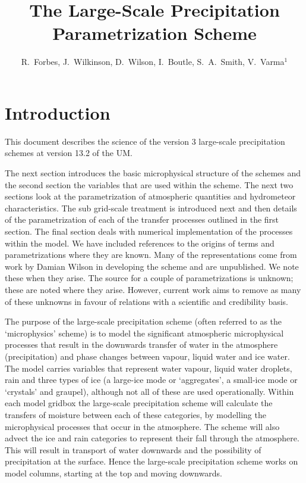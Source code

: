 \documentclass{UMDP_article}
\title{The Large-Scale Precipitation Parametrization Scheme}
\author{R.~Forbes, J.~Wilkinson, D.~Wilson, I.~Boutle, S.~A.~Smith, V.~Varma$^{1}$}
\begin{document}
\maketitle

\tableofcontents

\newpage
\section{Introduction}

This document describes the science of the version 3 large-scale precipitation 
schemes at version 13.2 of the UM.

The next section introduces the basic microphysical structure of the schemes 
and the second section the variables that are used within the scheme. 
The next two sections look at the parametrization of atmospheric quantities 
and hydrometeor characteristics. The sub grid-scale treatment is introduced next 
and then details of the parametrization of each of the transfer processes 
outlined in the first section. The final section deals with numerical 
implementation of the processes within the model. 
We have included references to the origins of terms and
parametrizations where they are known. Many of the representations come from work
by Damian Wilson in developing the scheme and are unpublished. We note these
when they arise. The source for a couple of parametrizations is unknown; these
are noted where they arise. However, current work aims to remove as many of
these unknowns in favour of relations with a scientific and credibility basis. 

The purpose of the large-scale precipitation scheme (often referred to as the
`microphysics' scheme) is to model the significant atmospheric microphysical 
processes that result in the downwards transfer of water in the atmosphere 
(precipitation) and phase changes between vapour, liquid water and ice water. 
The model carries variables that represent water vapour, liquid water droplets, 
rain and three types of ice (a large-ice mode or `aggregates', a small-ice mode 
or `crystals' and graupel), although not all of these are used operationally. 
Within each model gridbox the large-scale 
precipitation scheme will calculate the transfers of moisture between each of 
these categories, by modelling the microphysical processes that occur in the 
atmosphere. The scheme will also advect the ice and rain categories to represent 
their fall through the atmosphere. This will result in transport of water 
downwards and the possibility of precipitation at the surface. Hence the 
large-scale precipitation scheme works on model columns, starting at the top 
and moving downwards.
\end{document}
